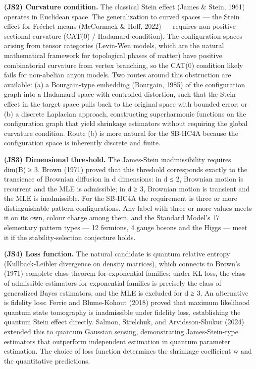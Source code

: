 \documentclass[
]{article}
\begin{document}
\textbf{(JS2) Curvature condition.} The classical Stein effect (James \&
Stein, 1961) operates in Euclidean space. The generalization to curved
spaces --- the Stein effect for Fréchet means (McCormack \& Hoff, 2022)
--- requires non-positive sectional curvature (CAT(0) / Hadamard
condition). The configuration spaces arising from tensor categories
(Levin-Wen models, which are the natural mathematical framework for
topological phases of matter) have positive combinatorial curvature from
vertex branching, so the CAT(0) condition likely fails for non-abelian
anyon models. Two routes around this obstruction are available: (a) a
Bourgain-type embedding (Bourgain, 1985) of the configuration graph into
a Hadamard space with controlled distortion, such that the Stein effect
in the target space pulls back to the original space with bounded error;
or (b) a discrete Laplacian approach, constructing superharmonic
functions on the configuration graph that yield shrinkage estimators
without requiring the global curvature condition. Route (b) is more
natural for the SB-HC4A because the configuration space is inherently
discrete and finite.

\textbf{(JS3) Dimensional threshold.} The James-Stein inadmissibility
requires dim(B) ≥ 3. Brown (1971) proved that this threshold corresponds
exactly to the transience of Brownian diffusion in d dimensions: in d ≤
2, Brownian motion is recurrent and the MLE is admissible; in d ≥ 3,
Brownian motion is transient and the MLE is inadmissible. For the
SB-HC4A the requirement is three or more distinguishable pattern
configurations. Any label with three or more values meets it on its own,
colour charge among them, and the Standard Model's 17 elementary pattern
types --- 12 fermions, 4 gauge bosons and the Higgs --- meet it if the
stability-selection conjecture holds.

\textbf{(JS4) Loss function.} The natural candidate is quantum relative
entropy (Kullback-Leibler divergence on density matrices), which
connects to Brown's (1971) complete class theorem for exponential
families: under KL loss, the class of admissible estimators for
exponential families is precisely the class of generalized Bayes
estimators, and the MLE is excluded for d ≥ 3. An alternative is
fidelity loss: Ferrie and Blume-Kohout (2018) proved that maximum
likelihood quantum state tomography is inadmissible under fidelity loss,
establishing the quantum Stein effect directly. Salmon, Strelchuk, and
Arvidsson-Shukur (2024) extended this to quantum Gaussian sensing,
demonstrating James-Stein-type estimators that outperform independent
estimation in quantum parameter estimation. The choice of loss function
determines the shrinkage coefficient w and the quantitative predictions.
\end{document}
